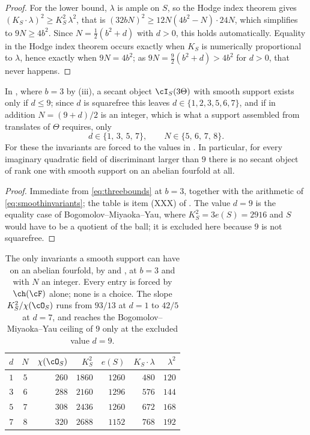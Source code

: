 \begin{proof}
For the lower bound, $\lambda$ is ample on $S$, so the Hodge index theorem
gives $(K_{S}\cdot\lambda)^{2}\ge K_{S}^{2}\,\lambda^{2}$, that is
$(32bN)^{2}\ge12N(4b^{2}-N)\cdot24N$, which simplifies to $9N\ge4b^{2}$. Since
$N=\tfrac12(b^{2}+d)$ with $d>0$, this holds automatically. Equality in the
Hodge index theorem occurs exactly when $K_{S}$ is numerically proportional to
$\lambda$, hence exactly when $9N=4b^{2}$; as $9N=\tfrac92(b^{2}+d)>4b^{2}$ for
$d>0$, that never happens.
\end{proof}

\begin{corollary}\label{cor:fourdiscriminants}
In , where $b=3$ by (iii), a secant
object $\cI_{S}(3\Theta)$ with smooth support exists only if $d\le9$; since
$d$ is squarefree this leaves $d\in\{1,2,3,5,6,7\}$, and if in addition
$N=(9+d)/2$ is an integer, which is what a support assembled from translates
of $\Theta$ requires, only
\[
  d\in\{1,\,3,\,5,\,7\},\qquad N\in\{5,\,6,\,7,\,8\}.
\]
For these the invariants are forced to the values in
. In particular, for every imaginary quadratic field
of discriminant larger than $9$ there is no secant object of rank one with
smooth support on an abelian fourfold at all.
\end{corollary}

\begin{proof}
Immediate from \eqref{eq:threebounds} at $b=3$, together with the arithmetic
of \eqref{eq:smoothinvariants}; the table is item (XXX) of
. The value $d=9$ is the equality case of
Bogomolov--Miyaoka--Yau, where $K_{S}^{2}=3e(S)=2916$ and $S$ would have to be
a quotient of the ball; it is excluded here because $9$ is not squarefree.
\end{proof}

\begin{table}[htbp]
\centering
\small
\renewcommand{\arraystretch}{1.12}
\begin{tabular}{@{}ccrrrrr@{}}
\toprule
$d$ & $N$ & $\chi(\cO_{S})$ & $K_{S}^{2}$ & $e(S)$ &
$K_{S}\cdot\lambda$ & $\lambda^{2}$ \\
\midrule
$1$ & $5$ & $260$ & $1860$ & $1260$ & $480$ & $120$ \\
$3$ & $6$ & $288$ & $2160$ & $1296$ & $576$ & $144$ \\
$5$ & $7$ & $308$ & $2436$ & $1260$ & $672$ & $168$ \\
$7$ & $8$ & $320$ & $2688$ & $1152$ & $768$ & $192$ \\
\bottomrule
\end{tabular}
\caption{The only invariants a smooth support can have on an abelian
fourfold, by  and
, at $b=3$ and with $N$ an integer. Every entry is
forced by $\ch(\cF)$ alone; none is a choice. The slope
$K_{S}^{2}/\chi(\cO_{S})$ runs from $93/13$ at $d=1$ to $42/5$ at $d=7$, and
reaches the Bogomolov--Miyaoka--Yau ceiling of $9$ only at the excluded value
$d=9$.}
\label{tab:smoothsupport}
\end{table}

